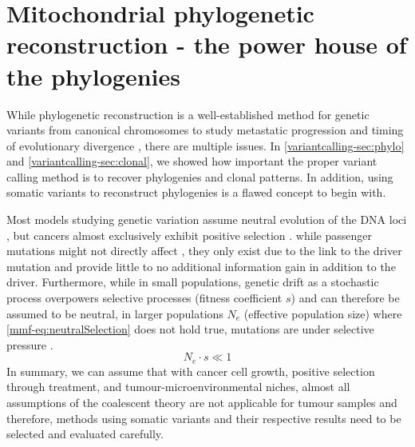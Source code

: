 \section[Mitochondrial phylogenetic reconstruction]{Mitochondrial phylogenetic reconstruction - the power house of the phylogenies}
\label{cascade-sec:mitochondria}

While phylogenetic reconstruction is a well-established method for genetic variants from canonical chromosomes to study metastatic progression and timing of evolutionary divergence \cite{Deshwar2015,Brown2017,Hu2019}, there are multiple issues. In \autoref{variantcalling-sec:phylo} and \autoref{variantcalling-sec:clonal}, we showed how important the proper variant calling method is to recover phylogenies and clonal patterns. In addition, using somatic variants to reconstruct phylogenies is a flawed concept to begin with. 

Most models studying genetic variation assume neutral evolution of the DNA loci \cite{Kimura1968,Lynch1989}, but cancers almost exclusively exhibit positive selection \cite{Cannataro2018}.  while passenger mutations might not directly affect  , they only exist due to the link to the driver mutation and provide little to no additional information gain in addition to the driver. Furthermore, while in small populations, genetic drift as a stochastic process overpowers selective processes (fitness coefficient $s$) and can therefore be assumed to be neutral, in larger populations $N_e$ (effective population size) where \autoref{mmf-eq:neutralSelection} does not hold true, mutations are under selective pressure \cite{EyreWalker2007}.
\begin{equation}
N_e \cdot s \ll 1 \label{mmf-eq:neutralSelection}
\end{equation}
\myequation[\ref{mmf-eq:neutralSelection}]{Selective pressure with effective population size}
\vspace{-3em}
In summary, we can assume that with cancer cell growth, positive selection through treatment, and tumour-microenvironmental niches, almost all assumptions of the coalescent theory \cite{Kingman1982} are not applicable for tumour samples and therefore, methods using somatic variants and their respective results need to be selected and evaluated carefully.

